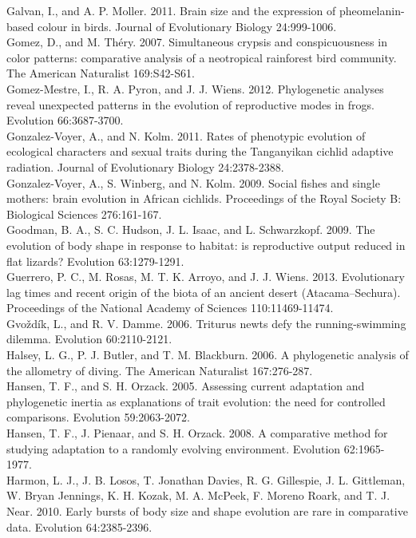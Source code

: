 Galvan, I., and A. P. Moller. 2011. Brain size and the expression of pheomelanin-based colour in birds. Journal of Evolutionary Biology 24:999-1006.\\
Gomez, D., and M. Théry. 2007. Simultaneous crypsis and conspicuousness in color patterns: comparative analysis of a neotropical rainforest bird community. The American Naturalist 169:S42-S61.\\
Gomez-Mestre, I., R. A. Pyron, and J. J. Wiens. 2012. Phylogenetic analyses reveal unexpected patterns in the evolution of reproductive modes in frogs. Evolution 66:3687-3700.\\
Gonzalez-Voyer, A., and N. Kolm. 2011. Rates of phenotypic evolution of ecological characters and sexual traits during the Tanganyikan cichlid adaptive radiation. Journal of Evolutionary Biology 24:2378-2388.\\
Gonzalez-Voyer, A., S. Winberg, and N. Kolm. 2009. Social fishes and single mothers: brain evolution in African cichlids. Proceedings of the Royal Society B: Biological Sciences 276:161-167.\\
Goodman, B. A., S. C. Hudson, J. L. Isaac, and L. Schwarzkopf. 2009. The evolution of body shape in response to habitat: is reproductive output reduced in flat lizards? Evolution 63:1279-1291.\\
Guerrero, P. C., M. Rosas, M. T. K. Arroyo, and J. J. Wiens. 2013. Evolutionary lag times and recent origin of the biota of an ancient desert (Atacama–Sechura). Proceedings of the National Academy of Sciences 110:11469-11474.\\
Gvoždík, L., and R. V. Damme. 2006. Triturus newts defy the running-swimming dilemma. Evolution 60:2110-2121.\\
Halsey, L. G., P. J. Butler, and T. M. Blackburn. 2006. A phylogenetic analysis of the allometry of diving. The American Naturalist 167:276-287.\\
Hansen, T. F., and S. H. Orzack. 2005. Assessing current adaptation and phylogenetic inertia as explanations of trait evolution: the need for controlled comparisons. Evolution 59:2063-2072.\\
Hansen, T. F., J. Pienaar, and S. H. Orzack. 2008. A comparative method for studying adaptation to a randomly evolving environment. Evolution 62:1965-1977.\\
Harmon, L. J., J. B. Losos, T. Jonathan Davies, R. G. Gillespie, J. L. Gittleman, W. Bryan Jennings, K. H. Kozak, M. A. McPeek, F. Moreno Roark, and T. J. Near. 2010. Early bursts of body size and shape evolution are rare in comparative data. Evolution 64:2385-2396.\\
